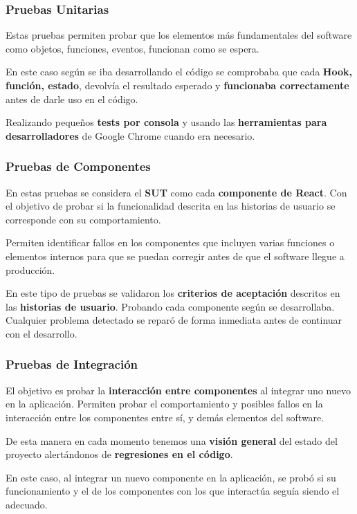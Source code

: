 \documentclass[12pt,twoside,titlepage]{report}
\begin{document}
\subsubsection{Pruebas Unitarias}

Estas pruebas permiten probar que los elementos más fundamentales del software como objetos, funciones, eventos, funcionan como se espera. 

En este caso según se iba desarrollando el código se comprobaba que cada \textbf{Hook, función, estado}, devolvía el resultado esperado y \textbf{funcionaba correctamente} antes de darle uso en el código. 

Realizando pequeños \textbf{tests por consola} y usando las \textbf{herramientas para desarrolladores} de Google Chrome cuando era necesario.

\subsubsection{Pruebas de Componentes}

En estas pruebas se considera el \textbf{SUT} como cada \textbf{componente de React}. Con el objetivo de probar si la funcionalidad descrita en las historias de usuario se corresponde con su comportamiento.

Permiten identificar fallos en los componentes que incluyen varias funciones o elementos internos para que se puedan corregir antes de que el software llegue a producción. 

En este tipo de pruebas se validaron los \textbf{criterios de aceptación} descritos en las \textbf{historias de usuario}. Probando cada componente según se desarrollaba. Cualquier problema detectado se reparó de forma inmediata antes de continuar con el desarrollo.

\subsubsection{Pruebas de Integración}

El objetivo es probar la \textbf{interacción entre componentes} al integrar uno nuevo en la aplicación. Permiten probar el comportamiento y posibles fallos en la interacción entre los componentes entre sí, y demás elementos del software.

De esta manera en cada momento tenemos una \textbf{visión general} del estado del proyecto alertándonos de \textbf{regresiones en el código}.

En este caso, al integrar un nuevo componente en la aplicación, se probó si su funcionamiento y el de los componentes con los que interactúa seguía siendo el adecuado.
\end{document}
